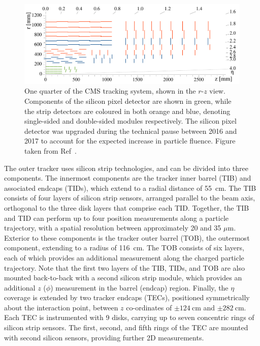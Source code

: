 \begin{figure}[htbp!]
\centering
\includegraphics[width =0.92\linewidth]{Figures/Detector/CMS/tracker_run2_upgraded.pdf}\hfill%
\caption[The CMS tracking system.]{One quarter of the CMS tracking system, shown in the $r$-$z$ view. Components of the silicon pixel detector are shown in green, while the strip detectors are coloured in both orange and blue, denoting single-sided and double-sided modules respectively. The silicon pixel detector was upgraded during the technical pause between 2016 and 2017 to account for the expected increase in particle fluence. Figure taken from Ref~\cite{CMS_phase2_tracker_upgrade}.}
\label{fig:cms_tracker}
\end{figure}

The outer tracker uses silicon strip technologies, and can be divided into three components. The innermost components are the tracker inner barrel (TIB) and associated endcaps (TIDs), which extend to a radial distance of 55~cm. The TIB consists of four layers of silicon strip sensors, arranged parallel to the beam axis, orthogonal to the three disk layers that comprise each TID. %
Together, the TIB and TID can perform up to four position measurements along a particle trajectory, with a spatial resolution between approximately 20 and 35 $\mu\mathrm{m}$.
Exterior to these components is the tracker outer barrel (TOB), the outermost component, extending to a radius of 116~cm. The TOB consists of six layers, each of which provides an additional measurement along the charged particle trajectory.
Note that the first two layers of the TIB, TIDs, and TOB are also mounted back-to-back with a second silicon strip module, which provides an additional $z$ ($\phi$) measurement in the barrel (endcap) region. Finally, the $\eta$ coverage is extended by two tracker endcaps (TECs), positioned symmetrically about the interaction point, between $z$ co-ordinates of $\pm124~\mathrm{cm}$ and $\pm282~\mathrm{cm}$. 
Each TEC is instrumented with 9 disks, carrying up to seven concentric rings of silicon strip sensors. The first, second, and fifth rings of the TEC are mounted with second silicon sensors, providing further 2D measurements.

